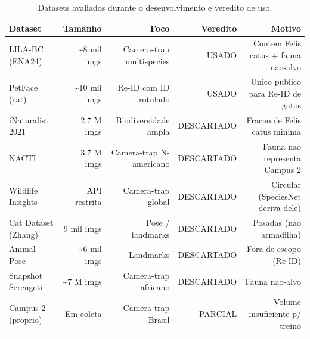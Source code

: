 \begin{table}[!htb]
\centering
\caption{Datasets avaliados durante o desenvolvimento e veredito de uso.}
\label{tab:datasets-avaliados}
\begin{tabular}{lrrrr}
\toprule
Dataset & Tamanho & Foco & Veredito & Motivo \\
\midrule
LILA-BC (ENA24) & \textasciitilde{}8 mil imgs & Camera-trap multispecies & USADO & Contem Felis catus + fauna nao-alvo \\
PetFace (cat) & \textasciitilde{}10 mil imgs & Re-ID com ID rotulado & USADO & Unico publico para Re-ID de gatos \\
iNaturalist 2021 & 2.7 M imgs & Biodiversidade ampla & DESCARTADO & Fracao de Felis catus minima \\
NACTI & 3.7 M imgs & Camera-trap N-americano & DESCARTADO & Fauna nao representa Campus 2 \\
Wildlife Insights & API restrita & Camera-trap global & DESCARTADO & Circular (SpeciesNet deriva dele) \\
Cat Dataset (Zhang) & 9 mil imgs & Pose / landmarks & DESCARTADO & Posadas (nao armadilha) \\
Animal-Pose & \textasciitilde{}6 mil imgs & Landmarks & DESCARTADO & Fora de escopo (Re-ID) \\
Snapshot Serengeti & \textasciitilde{}7 M imgs & Camera-trap africano & DESCARTADO & Fauna nao-alvo \\
Campus 2 (proprio) & Em coleta & Camera-trap Brasil & PARCIAL & Volume insuficiente p/ treino \\
\bottomrule
\end{tabular}
\end{table}

